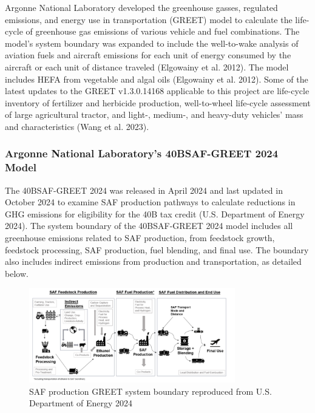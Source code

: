 \documentclass[12pt]{article}
\begin{document}
Argonne National Laboratory developed the greenhouse gasses, regulated emissions, and energy use in transportation (GREET) model to calculate the life-cycle of greenhouse gas emissions of various vehicle and fuel combinations. The model’s system boundary was expanded to include the well-to-wake analysis of aviation fuels and aircraft emissions for each unit of energy consumed by the aircraft or each unit of distance traveled (Elgowainy et al. 2012). The model includes HEFA from vegetable and algal oils (Elgowainy et al. 2012). Some of the latest updates to the GREET v1.3.0.14168 applicable to this project are life-cycle inventory of fertilizer and herbicide production, well-to-wheel life-cycle assessment of large agricultural tractor, and light-, medium-, and heavy-duty vehicles’ mass and characteristics (Wang et al. 2023).

\subsubsection{Argonne National Laboratory’s 40BSAF-GREET 2024 Model
}
The 40BSAF-GREET 2024 was released in April 2024 and last updated in October 2024 to examine SAF production pathways to calculate reductions in GHG emissions for eligibility for the 40B tax credit (U.S. Department of Energy 2024). The system boundary of the 40BSAF-GREET 2024 model includes all greenhouse emissions related to SAF production, from feedstock growth, feedstock processing, SAF production, fuel blending, and final use. The boundary also includes indirect emissions from production and transportation, as detailed below. 

\begin{figure}[H]
\centering
\includegraphics[width=0.8\textwidth]{Figure 11.png} %
\caption{SAF production GREET system boundary reproduced from U.S. Department of Energy 2024}
\label{fig:figure11}
\end{figure}
\end{document}
